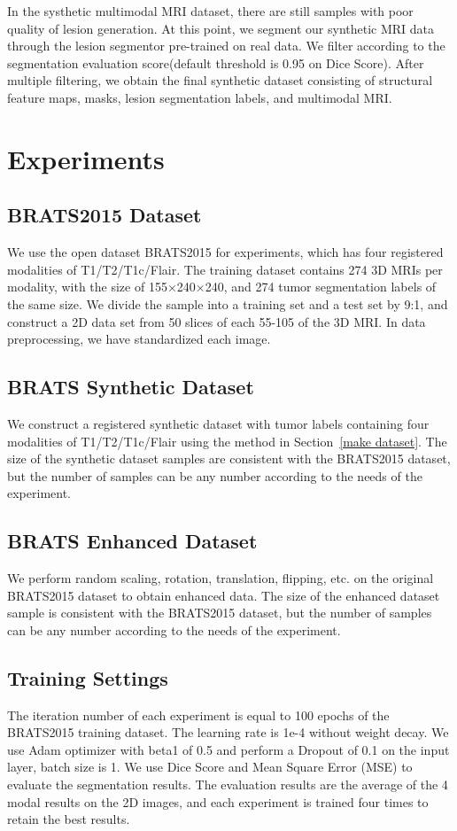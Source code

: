\documentclass[letterpaper]{article} %
\begin{document}
In the systhetic multimodal MRI dataset, there are still samples with poor quality of lesion generation. At this point, we segment our synthetic MRI data through the lesion segmentor pre-trained on real data. We filter according to the segmentation evaluation score(default threshold is 0.95 on Dice Score). After multiple filtering, we obtain the final synthetic dataset consisting of structural feature maps, masks, lesion segmentation labels, and multimodal MRI.

\section{Experiments}

\subsection{BRATS2015 Dataset}
We use the open dataset BRATS2015\cite{91menze:hal-00935640} for experiments, which has four registered modalities of T1/T2/T1c/Flair. The training dataset contains 274 3D MRIs per modality, with the size of 155$\times$240$\times$240, and 274 tumor segmentation labels of the same size. We divide the sample into a training set and a test set by 9:1, and construct a 2D data set from 50 slices of each 55-105 of the 3D MRI. In data preprocessing, we have standardized each image.

\subsection{BRATS Synthetic Dataset}
We construct a registered synthetic dataset with tumor labels containing four modalities of T1/T2/T1c/Flair using the method in Section~\ref{make dataset}. The size of the synthetic dataset samples are consistent with the BRATS2015 dataset, but the number of samples can be any number according to the needs of the experiment.

\subsection{BRATS Enhanced Dataset}
We perform random scaling, rotation, translation, flipping, etc. on the original BRATS2015 dataset to obtain enhanced data. The size of the enhanced dataset sample is consistent with the BRATS2015 dataset, but the number of samples can be any number according to the needs of the experiment.

\subsection{Training Settings}
The iteration number of each experiment is equal to 100 epochs of the BRATS2015 training dataset. The learning rate is 1e-4 without weight decay. We use Adam optimizer with beta1 of 0.5 and perform a Dropout of 0.1 on the input layer, batch size is 1. We use Dice Score \cite{95dice1945measures} and Mean Square Error (MSE)\cite{94prasad1990the} to evaluate the segmentation results. The evaluation results are the average of the 4 modal results on the 2D images, and each experiment is trained four times to retain the best results.
\end{document}
